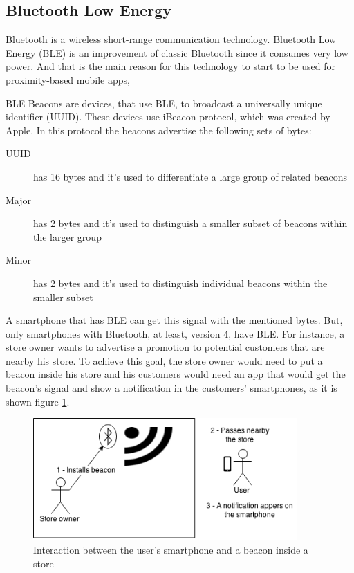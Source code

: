 \subsection{Bluetooth Low Energy}
\label{sub:bluetooth_low_energy}
Bluetooth is a wireless short-range communication technology.
Bluetooth Low Energy (BLE)\cite{martellibluetooth} 
is an improvement of classic Bluetooth since it consumes 
very low power.
And that is the main reason for this technology to start to 
be used for proximity-based mobile apps,

BLE Beacons are devices, that use BLE, to broadcast a 
universally unique identifier (UUID). 
These devices use iBeacon protocol, which was created
by Apple\texttrademark. In this protocol the beacons
advertise the following sets of bytes:
\begin{description}
  \item[UUID] has 16 bytes and it's used to differentiate a 
  large group of related beacons
  \item[Major] has 2 bytes and it's used to distinguish a smaller 
  subset of beacons within the larger group
  \item[Minor] has 2 bytes and it's used to distinguish individual
  beacons within the smaller subset
\end{description}
A smartphone that
has BLE can get this signal with the mentioned bytes.
But, only smartphones
with Bluetooth, at least, version 4, have BLE.
For instance, a store owner wants to advertise a promotion
to potential customers that are nearby his store. To 
achieve this goal, the store owner would need to put
a beacon inside his store and his customers would need an
app that would get the beacon's signal and show a 
notification in the customers' smartphones,
as it is shown figure \ref{fig:store_example}.
\begin{figure}[!ht]
  \centering
    \includegraphics[width=0.9\textwidth]{img/store_example}
    \caption{Interaction between the user's smartphone
    and a beacon inside a store}
    \label{fig:store_example}
\end{figure}

